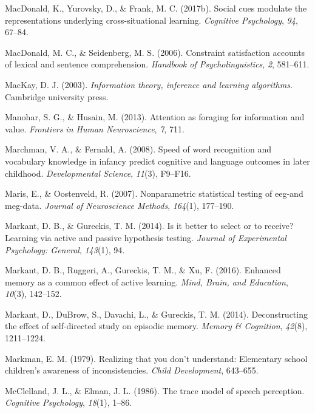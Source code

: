 \documentclass[oneside]{report}
\begin{document}
\hypertarget{ref-macdonald2017social}{}
MacDonald, K., Yurovsky, D., \& Frank, M. C. (2017b). Social cues
modulate the representations underlying cross-situational learning.
\emph{Cognitive Psychology}, \emph{94}, 67--84.

\hypertarget{ref-macdonald2006constraint}{}
MacDonald, M. C., \& Seidenberg, M. S. (2006). Constraint satisfaction
accounts of lexical and sentence comprehension. \emph{Handbook of
Psycholinguistics}, \emph{2}, 581--611.

\hypertarget{ref-mackay2003information}{}
MacKay, D. J. (2003). \emph{Information theory, inference and learning
algorithms}. Cambridge university press.

\hypertarget{ref-manohar2013attention}{}
Manohar, S. G., \& Husain, M. (2013). Attention as foraging for
information and value. \emph{Frontiers in Human Neuroscience}, \emph{7},
711.

\hypertarget{ref-marchman2008speed}{}
Marchman, V. A., \& Fernald, A. (2008). Speed of word recognition and
vocabulary knowledge in infancy predict cognitive and language outcomes
in later childhood. \emph{Developmental Science}, \emph{11}(3), F9--F16.

\hypertarget{ref-maris2007nonparametric}{}
Maris, E., \& Oostenveld, R. (2007). Nonparametric statistical testing
of eeg-and meg-data. \emph{Journal of Neuroscience Methods},
\emph{164}(1), 177--190.

\hypertarget{ref-markant2014better}{}
Markant, D. B., \& Gureckis, T. M. (2014). Is it better to select or to
receive? Learning via active and passive hypothesis testing.
\emph{Journal of Experimental Psychology: General}, \emph{143}(1), 94.

\hypertarget{ref-markant2016enhanced}{}
Markant, D. B., Ruggeri, A., Gureckis, T. M., \& Xu, F. (2016). Enhanced
memory as a common effect of active learning. \emph{Mind, Brain, and
Education}, \emph{10}(3), 142--152.

\hypertarget{ref-markant2014deconstructing}{}
Markant, D., DuBrow, S., Davachi, L., \& Gureckis, T. M. (2014).
Deconstructing the effect of self-directed study on episodic memory.
\emph{Memory \& Cognition}, \emph{42}(8), 1211--1224.

\hypertarget{ref-markman1979realizing}{}
Markman, E. M. (1979). Realizing that you don't understand: Elementary
school children's awareness of inconsistencies. \emph{Child
Development}, 643--655.

\hypertarget{ref-mcclelland1986trace}{}
McClelland, J. L., \& Elman, J. L. (1986). The trace model of speech
perception. \emph{Cognitive Psychology}, \emph{18}(1), 1--86.
\end{document}
